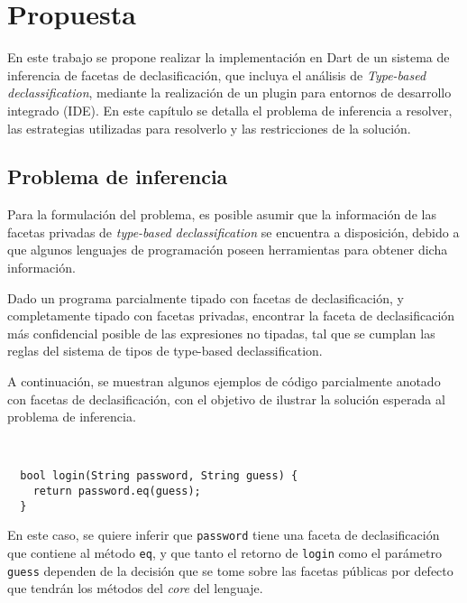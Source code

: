 \chapter{Propuesta}

En este trabajo se propone realizar la implementación en Dart de un sistema de inferencia de facetas de declasificación, que incluya el análisis de \textit{Type-based declassification}, mediante la realización de un plugin para entornos de desarrollo integrado (IDE). En este capítulo se detalla el problema de inferencia a resolver, las estrategias utilizadas para resolverlo y las restricciones de la solución.

\section{Problema de inferencia}
Para la formulación del problema, es posible asumir que la información de las facetas privadas de \textit{type-based declassification} se encuentra a disposición, debido a que algunos lenguajes de programación poseen herramientas para obtener dicha información.

\begin{defn}
  Dado un programa parcialmente tipado con facetas de declasificación, y completamente tipado con facetas privadas, encontrar la faceta de declasificación más confidencial posible de las expresiones no tipadas, tal que se cumplan las reglas del sistema de tipos de type-based declassification.
\end{defn}

A continuación, se muestran algunos ejemplos de código parcialmente anotado con facetas de declasificación, con el objetivo de ilustrar la solución esperada al problema de inferencia.

\begin{ej} \ \\
  \label{ej1}
  \normalfont
\begin{lstlisting}
  bool login(String password, String guess) {
    return password.eq(guess);
  }
\end{lstlisting}
\end{ej}

En este caso, se quiere inferir que \texttt{password} tiene una faceta de declasificación que contiene al método \texttt{eq}, y que tanto el retorno de \texttt{login} como el parámetro \texttt{guess} dependen de la decisión que se tome sobre las facetas públicas por defecto que tendrán los métodos del \textit{core} del lenguaje.

